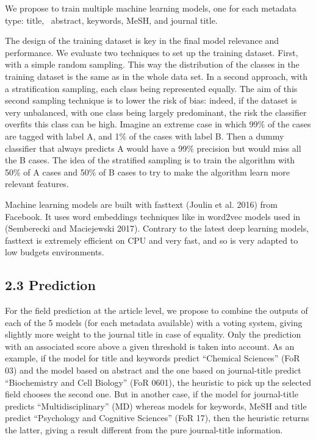 \documentclass[
]{article}
\begin{document}
We propose to train multiple machine learning models, one for each
metadata type: title, ~abstract, keywords, MeSH, and journal title.

The design of the training dataset is key in the final model relevance
and performance. We evaluate two techniques to set up the training
dataset. First, with a simple random sampling. This way the distribution
of the classes in the training dataset is the same as in the whole data
set. In a second approach, with a stratification sampling, each class
being represented equally. The aim of this second sampling technique is
to lower the risk of bias: indeed, if the dataset is very unbalanced,
with one class being largely predominant, the risk the classifier
overfits this class can be high. Imagine an extreme case in which 99\%
of the cases are tagged with label A, and 1\% of the cases with label B.
Then a dummy classifier that always predicts A would have a 99\%
precision but would miss all the B cases. The idea of the stratified
sampling is to train the algorithm with 50\% of A cases and 50\% of B
cases to try to make the algorithm learn more relevant features.

Machine learning models are built with fasttext (Joulin et al. 2016)
from Facebook. It uses word embeddings techniques like in word2vec
models used in (Semberecki and Maciejewski 2017). Contrary to the latest
deep learning models, fasttext is extremely efficient on CPU and very
fast, and so is very adapted to low budgets environments.

\hypertarget{prediction}{%
\subsection{2.3 Prediction}\label{prediction}}

For the field prediction at the article level, we propose to combine the
outputs of each of the 5 models (for each metadata available) with a
voting system, giving slightly more weight to the journal title in case
of equality. Only the prediction with an associated score above a given
threshold is taken into account. As an example, if the model for title
and keywords predict ``Chemical Sciences'' (FoR 03) and the model based
on abstract and the one based on journal-title predict ``Biochemistry
and Cell Biology'' (FoR 0601), the heuristic to pick up the selected
field chooses the second one. But in another case, if the model for
journal-title predicts ``Multidisciplinary'' (MD) whereas models for
keywords, MeSH and title predict ``Psychology and Cognitive Sciences''
(FoR 17), then the heuristic returns the latter, giving a result
different from the pure journal-title information.
\end{document}
